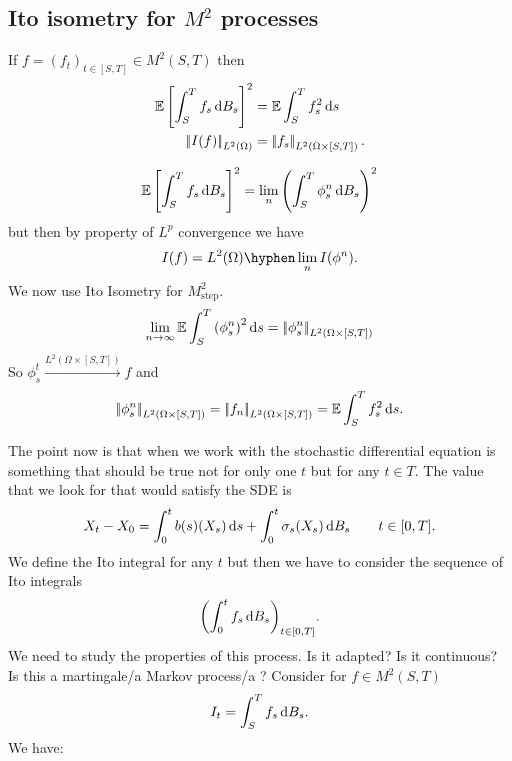 \documentclass[crop=false, class=article]{standalone}
\begin{document}
\subsection{Ito isometry for $M^2$ processes}
If $f={(f_t)}_{t\in[S,T]}\in M^2(S,T)$ then
\begin{align*}
	\mathbb{E}\left[\int_{S}^{T} f_s\mathop{}\!\mathrm{d} B_{s}\right]^2 &= \mathbb{E}\int_{S}^{T} f_s^2\mathop{}\!\mathrm{d} s \\
	\left|\negthinspace\left|I(f)\right|\negthinspace\right|_{L^2(\Omega)} &= \left|\negthinspace\left|f_s\right|\negthinspace\right|_{L^2(\Omega\times[S,T])}.
\end{align*}
\begin{fancyproof}
	\begin{equation*}
		\mathbb{E}\left[\int_{S}^{T} f_s\mathop{}\!\mathrm{d} B_{s}\right]^2=\lim_{n}\left(\int_{S}^{T}\phi_s^n\mathop{}\!\mathrm{d} B_{s}\right)^2
	\end{equation*}
	but then by property of $L^p$ convergence we have
	\begin{equation*}
		I(f)=L^2(\Omega)\hyphen\lim_{n}I(\phi^n).
	\end{equation*}
	We now use Ito Isometry for $M^2_{\mathrm{step}}$.
	\begin{equation*}
		\lim_{n \to \infty}\mathbb{E}\int_{S}^{T}{(\phi_s^n)}^2\mathop{}\!\mathrm{d} s=\left|\negthinspace\left|\phi_{s}^n\right|\negthinspace\right|_{L^2(\Omega\times[S,T])}
	\end{equation*}
	So $\phi_{s}^t\xrightarrow{L^2(\Omega\times[S,T])}f$ and 
	\begin{equation*}
		\left|\negthinspace\left|\phi_{s}^n\right|\negthinspace\right|_{L^2(\Omega\times[S,T])}=\left|\negthinspace\left|f_n\right|\negthinspace\right|_{L^2(\Omega\times[S,T])}=\mathbb{E}\int_{S}^{T} f_s^2\mathop{}\!\mathrm{d} s.
	\end{equation*}
\end{fancyproof}
The point now is that when we work with the stochastic differential equation is something that should be true not for only one $t$ but for any $t\in T$. The value that we look for that would satisfy the SDE is
\begin{equation*}
	X_t-X_0=\int_0^{t} b(s)(X_s)\mathop{}\!\mathrm{d} s+\int_0^{t}\sigma_s(X_s)\mathop{}\!\mathrm{d} B_{s}\qquad t\in[0,T].
\end{equation*}
We define the Ito integral for any $t$ but then we have to consider the sequence of Ito integrals
\begin{equation*}
	{\left(\int_0^{t}f_s\mathop{}\!\mathrm{d}B_{s}\right)}_{t\in[0,T]}.
\end{equation*}
We need to study the properties of this process. Is it adapted? Is it continuous? Is this a martingale/a Markov process/a \brm? Consider for $f\in M^2(S,T)$
\begin{equation*}
	I_t=\int_{S}^{T} f_s\mathop{}\!\mathrm{d} B_{s}.
\end{equation*}
We have:
\end{document}
